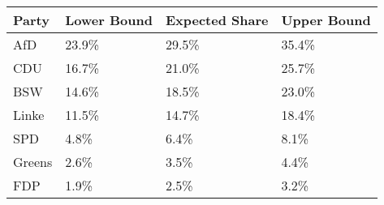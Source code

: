 \begin{tabular}{llll}
  \hline
Party & Lower Bound & Expected Share & Upper Bound \\ 
  \hline
AfD & 23.9\% & 29.5\% & 35.4\% \\ 
  CDU & 16.7\% & 21.0\% & 25.7\% \\ 
  BSW & 14.6\% & 18.5\% & 23.0\% \\ 
  Linke & 11.5\% & 14.7\% & 18.4\% \\ 
  SPD & 4.8\% & 6.4\% & 8.1\% \\ 
  Greens & 2.6\% & 3.5\% & 4.4\% \\ 
  FDP & 1.9\% & 2.5\% & 3.2\% \\ 
   \hline
\end{tabular}
